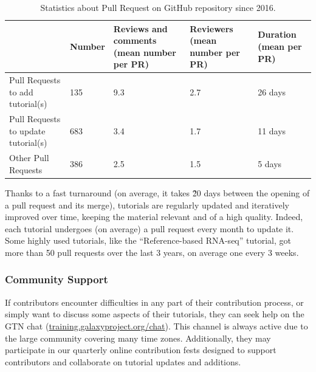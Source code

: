 \documentclass[10pt,letterpaper]{article}
\begin{document}
\begin{table}[]
\begin{adjustwidth}{-2.25in}{0in} %
	\centering
	\caption{Statistics about Pull Request on GitHub repository since 2016.\label{tbl:pullRequestReviewing}}
	\begin{tabular}{l|p{}p{}p{}p{}}
									        & Number & Reviews and comments (mean number per PR) & Reviewers (mean number per PR) & Duration (mean per PR) \\\hline
		Pull Requests to add tutorial(s)    & 135    & 9.3                                       & 2.7                            & 26 days\\
		Pull Requests to update tutorial(s) & 683    & 3.4                                       & 1.7                            & 11 days\\
		Other Pull Requests                 & 386    & 2.5                                       & 1.5                            & 5 days\\
	\end{tabular}
\end{adjustwidth}
\end{table}

Thanks to a fast turnaround (on average, it takes \~20 days between the opening of a pull request and its merge), tutorials are regularly updated and iteratively improved over time, keeping the material relevant and of a high quality.
Indeed, each tutorial undergoes (on average) a pull request every month to update it. Some highly used tutorials, like the “Reference-based RNA-seq” tutorial, got more than 50 pull requests over the last 3 years, on average one every 3 weeks.

\subsubsection*{Community Support}

If contributors encounter difficulties in any part of their contribution process, or simply want to discuss some aspects of their tutorials, they can seek help on the GTN chat (\url{training.galaxyproject.org/chat}). This channel is always active due to the large community covering many time zones.
Additionally, they may participate in our quarterly online contribution fests designed to support contributors and collaborate on tutorial updates and additions.
\end{document}
